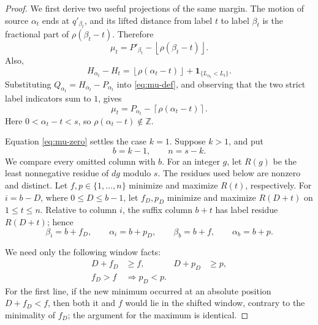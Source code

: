 \documentclass[10pt]{article}
\newcommand{\ind}{\mathbf 1}
\begin{document}
\begin{proof}
We first derive two useful projections of the same margin.  The motion of
source \(\alpha_t\) ends at \(q'_{\beta_t}\), and its lifted distance from
label \(t\) to label \(\beta_t\) is the fractional part of
\(\rho(\beta_t-t)\).  Therefore
\begin{equation}
  \mu_t
  =P'_{\beta_t}-\left\lfloor\rho(\beta_t-t)\right\rfloor.
  \label{eq:projection-right}
\end{equation}
Also,
\[
  H_{\alpha_t}-H_t
  =\left\lfloor\rho(\alpha_t-t)\right\rfloor
   +\ind_{\{L_{\alpha_t}<L_t\}}.
\]
Substituting \(Q_{\alpha_t}=H_{\alpha_t}-P_{\alpha_t}\) into
\eqref{eq:mu-def}, and observing that the two strict label indicators sum
to \(1\), gives
\begin{equation}
  \mu_t
  =P_{\alpha_t}-\left\lceil\rho(\alpha_t-t)\right\rceil.
  \label{eq:projection-left}
\end{equation}
Here \(0<\alpha_t-t<s\), so \(\rho(\alpha_t-t)\notin\mathbb Z\).

Equation \eqref{eq:mu-zero} settles the case \(k=1\).  Suppose \(k>1\), and
put
\[
  b=k-1,
  \qquad
  n=s-k.
\]
We compare every omitted column with \(b\).  For an integer \(g\), let
\(R(g)\) be the least nonnegative residue of \(dg\) modulo \(s\).  The
residues used below are nonzero and distinct.  Let
\(f,p\in\{1,\ldots,n\}\) minimize and maximize \(R(t)\), respectively.
For \(i=b-D\), where \(0\le D\le b-1\), let \(f_D,p_D\) minimize and
maximize \(R(D+t)\) on \(1\le t\le n\).  Relative to column \(i\), the
suffix column \(b+t\) has label residue \(R(D+t)\); hence
\begin{equation}
  \beta_i=b+f_D,
  \qquad
  \alpha_i=b+p_D,
  \qquad
  \beta_b=b+f,
  \qquad
  \alpha_b=b+p.
  \label{eq:alpha-beta-window}
\end{equation}

We need only the following window facts:
\begin{equation}
\begin{aligned}
  D+f_D&\ge f, & D+p_D&\ge p,\\
  f_D>f&\Longrightarrow p_D<p.
\end{aligned}
\label{eq:window-facts}
\end{equation}
For the first line, if the new minimum occurred at an absolute position
\(D+f_D<f\), then both it and \(f\) would lie in the shifted window, contrary
to the minimality of \(f_D\); the argument for the maximum is identical.


\end{proof}
\end{document}
